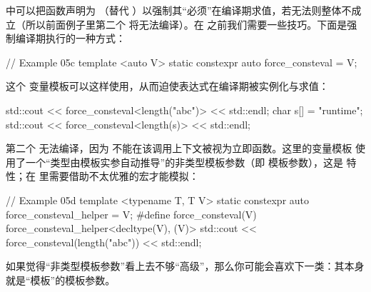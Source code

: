 \cpp[20] 中可以把函数声明为 （替代 ）以强制其“必须”在编译期求值，若无法则整体不成立（所以前面例子里第二个  将无法编译）。在 \cpp[20] 之前我们需要一些技巧。下面是强制编译期执行的一种方式：

\begin{code}
// Example 05c
template <auto V>
static constexpr auto force_consteval = V;
\end{code}

这个  变量模板可以这样使用，从而迫使表达式在编译期被实例化与求值：

\begin{code}
std::cout << force_consteval<length("abc")> << std::endl;
char s[] = "runtime";
std::cout << force_consteval<length(s)> << std::endl;
\end{code}

第二个  无法编译，因为  不能在该调用上下文被视为立即函数。这里的变量模板  使用了一个“类型由模板实参自动推导”的非类型模板参数（即  模板参数），这是 \cpp[17] 特性；在 \cpp[14] 里需要借助不太优雅的宏才能模拟：

\begin{code}
// Example 05d
template <typename T, T V>
static constexpr auto force_consteval_helper = V;
#define force_consteval(V)
force_consteval_helper<decltype(V), (V)>
std::cout << force_consteval(length("abc")) << std::endl;
\end{code}

如果觉得“非类型模板参数”看上去不够“高级”，那么你可能会喜欢下一类：其本身就是“模板”的模板参数。

